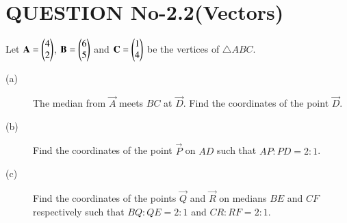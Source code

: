 \documentclass[journal,12pt,twocolumn]{IEEEtran}
\begin{document}
%
\section{QUESTION No-2.2(Vectors)}
\item Let $\mathbf{A} = \begin{pmatrix}4 \\ 2\end{pmatrix}$, $\mathbf{B}=\begin{pmatrix}6 \\ 5\end{pmatrix}$ and $\mathbf{C}=\begin{pmatrix}1 \\ 4\end{pmatrix}$ be the vertices of $\triangle ABC$.
\begin{description}
    \item [(a)] The median from $\vec{A}$ meets $BC$ at $\vec{D}$. Find the coordinates of the point $\vec{D}$.
    \item [(b)] Find the coordinates of the point $\vec{P}$ on $AD$
such that $AP : PD = 2 : 1$.
    \item [(c)] Find the coordinates of the points $\vec{Q}$ and $\vec{R}$
on medians $BE$ and $CF$ respectively such that $BQ : QE = 2 : 1$ and $CR : RF = 2 : 1$.
\end{description}
\end{document}
